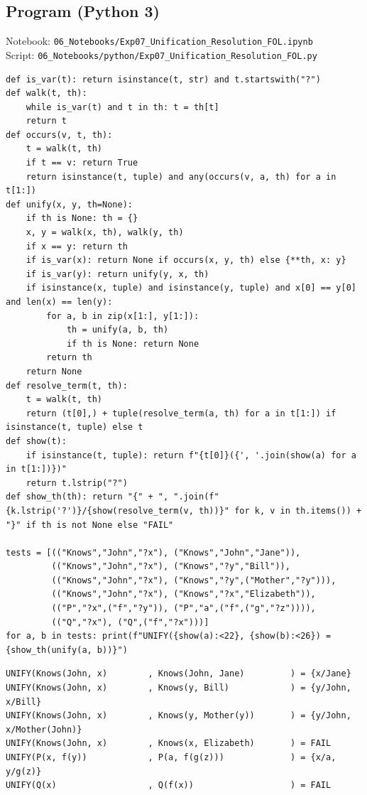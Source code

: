 \documentclass[11pt]{article}
\begin{document}
\subsection*{Program (Python 3)}
{\small\color{slate}Notebook: \texttt{06\_Notebooks/Exp07\_Unification\_Resolution\_FOL.ipynb}\\ Script: \texttt{06\_Notebooks/python/Exp07\_Unification\_Resolution\_FOL.py}}
\begin{lstlisting}[style=py]
def is_var(t): return isinstance(t, str) and t.startswith("?")
def walk(t, th):
    while is_var(t) and t in th: t = th[t]
    return t
def occurs(v, t, th):
    t = walk(t, th)
    if t == v: return True
    return isinstance(t, tuple) and any(occurs(v, a, th) for a in t[1:])
def unify(x, y, th=None):
    if th is None: th = {}
    x, y = walk(x, th), walk(y, th)
    if x == y: return th
    if is_var(x): return None if occurs(x, y, th) else {**th, x: y}
    if is_var(y): return unify(y, x, th)
    if isinstance(x, tuple) and isinstance(y, tuple) and x[0] == y[0] and len(x) == len(y):
        for a, b in zip(x[1:], y[1:]):
            th = unify(a, b, th)
            if th is None: return None
        return th
    return None
def resolve_term(t, th):
    t = walk(t, th)
    return (t[0],) + tuple(resolve_term(a, th) for a in t[1:]) if isinstance(t, tuple) else t
def show(t):
    if isinstance(t, tuple): return f"{t[0]}({', '.join(show(a) for a in t[1:])})"
    return t.lstrip("?")
def show_th(th): return "{" + ", ".join(f"{k.lstrip('?')}/{show(resolve_term(v, th))}" for k, v in th.items()) + "}" if th is not None else "FAIL"

tests = [(("Knows","John","?x"), ("Knows","John","Jane")),
         (("Knows","John","?x"), ("Knows","?y","Bill")),
         (("Knows","John","?x"), ("Knows","?y",("Mother","?y"))),
         (("Knows","John","?x"), ("Knows","?x","Elizabeth")),
         (("P","?x",("f","?y")), ("P","a",("f",("g","?z")))),
         (("Q","?x"), ("Q",("f","?x")))]
for a, b in tests: print(f"UNIFY({show(a):<22}, {show(b):<26}) = {show_th(unify(a, b))}")
\end{lstlisting}
\begin{lstlisting}[style=out]
UNIFY(Knows(John, x)        , Knows(John, Jane)         ) = {x/Jane}
UNIFY(Knows(John, x)        , Knows(y, Bill)            ) = {y/John, x/Bill}
UNIFY(Knows(John, x)        , Knows(y, Mother(y))       ) = {y/John, x/Mother(John)}
UNIFY(Knows(John, x)        , Knows(x, Elizabeth)       ) = FAIL
UNIFY(P(x, f(y))            , P(a, f(g(z)))             ) = {x/a, y/g(z)}
UNIFY(Q(x)                  , Q(f(x))                   ) = FAIL
\end{lstlisting}
\end{document}
